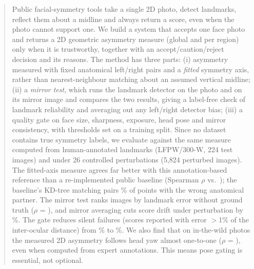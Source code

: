 \begin{abstract}
Public facial-symmetry tools take a single 2D photo, detect landmarks, reflect them
about a midline and always return a score, even when the photo cannot support one.
We build a system that accepts one face photo and returns a 2D geometric asymmetry
measure (global and per region) only when it is trustworthy, together with an
accept/caution/reject decision and its reasons. The method has three parts:
(i) asymmetry measured with fixed anatomical left/right pairs and a \emph{fitted}
symmetry axis, rather than nearest-neighbour matching about an assumed vertical midline;
(ii) a \emph{mirror test}, which runs the landmark detector on the photo and on its
mirror image and compares the two results, giving a label-free check of landmark
reliability and averaging out any left/right detector bias;
(iii) a quality gate on face size, sharpness, exposure, head pose and mirror
consistency, with thresholds set on a training split.
Since no dataset contains true symmetry labels, we evaluate against the same measure
computed from human-annotated landmarks (LFPW/300-W, 224 test images) and under 26
controlled perturbations (5{,}824 perturbed images).
The fitted-axis measure agrees far better with this annotation-based reference than a
re-implemented public baseline (Spearman $\rho$ \rhoMthree{} vs.\ \rhoMzero{}); the
baseline's KD-tree matching pairs \kdWrong\% of points with the wrong anatomical
partner. The mirror test ranks images by landmark error without ground truth
($\rho$ = \rhoMirrorNme{}), and mirror averaging cuts score drift under perturbation by
\driftReduction\%. The gate reduces silent failures (scores reported with error
$>$1\% of the inter-ocular distance) from \silentPoolOne\% to \silentPoolThree\%.
We also find that on in-the-wild photos the measured 2D asymmetry follows head yaw
almost one-to-one ($\rho$ = \rhoYawRef{}), even when computed from expert annotations.
This means pose gating is essential, not optional.
\end{abstract}
